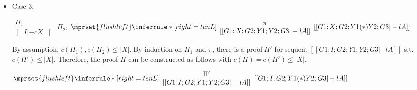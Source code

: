\begin{itemize}
\item Case 3:
      \begin{center}
        \scriptsize
        \begin{math}
          \begin{array}{c}
            \Pi_1 \\
            {[[I |-c X]]}
          \end{array}
        \end{math}
        \qquad\qquad
        $\Pi_2$:
        \begin{math}
          $$\mprset{flushleft}
          \inferrule* [right={\tiny tenL}] {
            {
              \begin{array}{c}
                \pi \\
                {[[G1; X; G2; Y1; Y2; G3 |-l A]]}
              \end{array}
            }
          }{[[G1; X; G2; Y1 (*) Y2; G3 |-l A]]}
        \end{math}
      \end{center}
      By assumption, $c(\Pi_1),c(\Pi_2)\leq |X|$. By induction on $\Pi_1$
      and $\pi$, there is a proof $\Pi'$ for sequent
      $[[G1; I; G2; Y1; Y2; G3 |-l A]]$ s.t. $c(\Pi') \leq |X|$. Therefore,
      the proof $\Pi$ can be constructed as follows with
      $c(\Pi) = c(\Pi') \leq |X|$.
      \begin{center}
        \scriptsize
        \begin{math}
          $$\mprset{flushleft}
          \inferrule* [right={\tiny tenL}] {
            {
              \begin{array}{c}
                \Pi' \\
                {[[G1; I; G2; Y1; Y2; G3 |-l A]]}
              \end{array}
            }
          }{[[G1; I; G2; Y1 (*) Y2; G3 |-l A]]}
        \end{math}
      \end{center}


\end{itemize}
